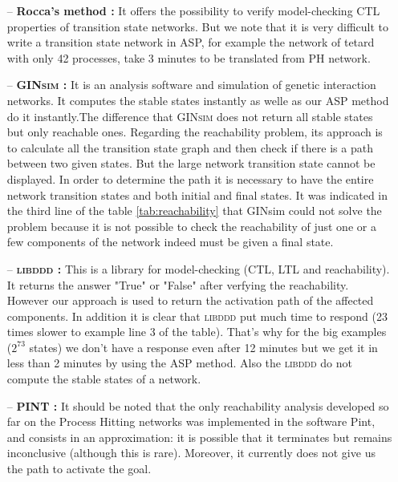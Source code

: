 \begin{itemize}

\item[--] \textbf{Rocca's method :} It offers the possibility to verify model-checking CTL properties of transition state networks. But we note that it is very difficult to write a transition state network in ASP, for example the network of tetard \cite{khalis2009smbionet} with only 42 processes, take 3 minutes to be translated from PH network.

\item[--] \textbf{\textsc{GINsim} :} It is an analysis software and simulation of genetic interaction networks. It computes the stable states instantly as welle as our ASP method do it instantly.The difference that \textsc{GINsim} does not return all stable states but only reachable ones. Regarding the reachability problem, its approach is to calculate all the transition state graph and then check if there is a path between two given states. But the large network transition state cannot be displayed. In order to determine the path it is necessary to have the entire network transition states and both initial and final states. It was indicated in the third line of the table \ref{tab:reachability} that GINsim could not solve the problem because it is not possible to check the reachability of just one or a few components of the network indeed must be given a final state. 

\item[--] \textbf{\textsc{libddd} :}
This is a library for model-checking (CTL, LTL and reachability). It returns the answer "True" or "False" after verfying the reachability. However our approach is used to return the activation path of the affected components. In addition it is clear that \textsc{libddd} put much time to respond (23 times slower to example line 3 of the table). That's why for the big examples ($2^{73}$ states) we don't have a response even after 12 minutes but we get it in less than 2 minutes by using the ASP method. Also the \textsc{libddd} do not compute the stable states of a network.

\item[--] \textbf{PINT : }It should be noted that the only reachability analysis developed so far on the Process Hitting networks was implemented in the software Pint, and consists in an approximation: it is possible that it terminates but remains inconclusive (although this is rare). Moreover, it currently does not give us the path to activate the goal.
\end{itemize}

